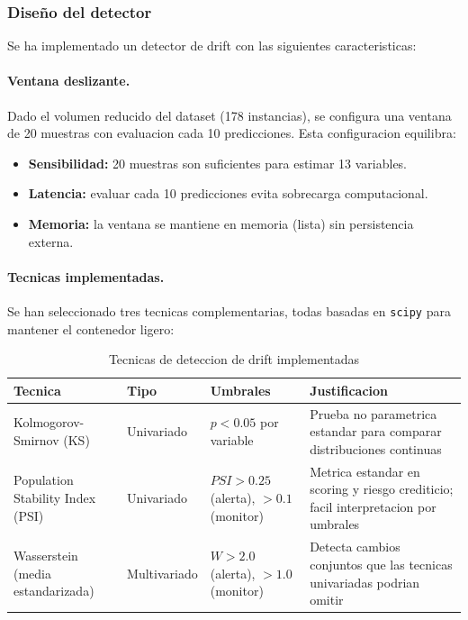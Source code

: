 \subsubsection{Dise\~{n}o del detector}

Se ha implementado un detector de drift con las siguientes caracteristicas:

\paragraph{Ventana deslizante.} Dado el volumen reducido del dataset (178 instancias), se configura una ventana de 20 muestras con evaluacion cada 10 predicciones. Esta configuracion equilibra:
\begin{itemize}
    \item \textbf{Sensibilidad:} 20 muestras son suficientes para estimar 13 variables.
    \item \textbf{Latencia:} evaluar cada 10 predicciones evita sobrecarga computacional.
    \item \textbf{Memoria:} la ventana se mantiene en memoria (lista) sin persistencia externa.
\end{itemize}

\paragraph{Tecnicas implementadas.} Se han seleccionado tres tecnicas complementarias, todas basadas en \texttt{scipy} para mantener el contenedor ligero:

\begin{table}[htbp]
\centering
\caption{Tecnicas de deteccion de drift implementadas}
\label{tab:tecnicas-drift}
\begin{tabular}{@{}llp{5cm}l@{}}
\toprule
\textbf{Tecnica} & \textbf{Tipo} & \textbf{Umbrales} & \textbf{Justificacion} \\
\midrule
Kolmogorov-Smirnov (KS) & Univariado & $p < 0.05$ por variable & Prueba no parametrica estandar para comparar distribuciones continuas \\
Population Stability Index (PSI) & Univariado & $PSI > 0.25$ (alerta), $> 0.1$ (monitor) & Metrica estandar en scoring y riesgo crediticio; facil interpretacion por umbrales \\
Wasserstein (media estandarizada) & Multivariado & $W > 2.0$ (alerta), $> 1.0$ (monitor) & Detecta cambios conjuntos que las tecnicas univariadas podrian omitir \\
\bottomrule
\end{tabular}
\end{table}

